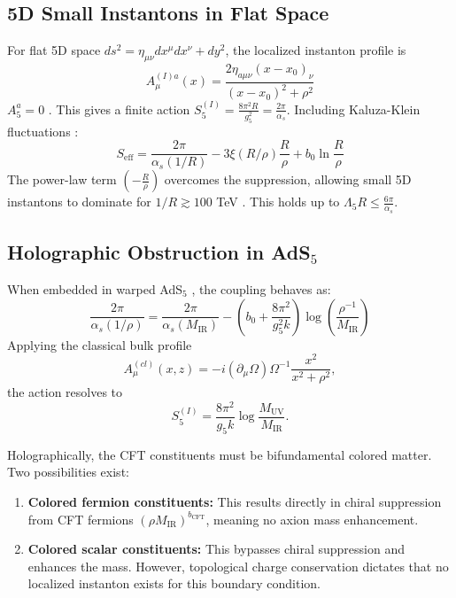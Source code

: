 \documentclass[11pt]{article}
\begin{document}
\subsection{5D Small Instantons in Flat Space}
For flat 5D space $ds^2 = \eta_{\mu\nu} dx^\mu dx^\nu + dy^2$, the localized instanton profile is
\begin{equation}
    A_\mu^{(I)a}(x) = \frac{2 \eta_{a\mu\nu} (x-x_0)_\nu}{(x-x_0)^2 + \rho^2}
\end{equation}
$A_5^a = 0$ \cite{poppitz2002}. This gives a finite action $S_5^{(I)} = \frac{8\pi^2 R}{g_5^2} = \frac{2\pi}{\alpha_s}$. Including Kaluza-Klein fluctuations \cite{dienes1998}:
\begin{equation}
    S_{\text{eff}} = \frac{2\pi}{\alpha_s(1/R)} - 3\xi(R/\rho) \frac{R}{\rho} + b_0 \ln \frac{R}{\rho}
\end{equation}
The power-law term $(- \frac{R}{\rho})$ overcomes the suppression, allowing small 5D instantons to dominate for $1/R \gtrsim 100$ TeV \cite{gherghetta2020}. This holds up to $\Lambda_5 R \le \frac{6\pi}{\alpha_s}$.

\subsection{Holographic Obstruction in AdS$_5$}
When embedded in warped AdS$_5$ \cite{gherghetta2021}, the coupling behaves as:
\begin{equation}
    \frac{2\pi}{\alpha_s(1/\rho)} = \frac{2\pi}{\alpha_s(M_{\text{IR}})} - \left(b_0 + \frac{8\pi^2}{g_5^2 k}\right) \log\left(\frac{\rho^{-1}}{M_{\text{IR}}}\right)
\end{equation}
Applying the classical bulk profile
\begin{equation}
    A_\mu^{(cl)}(x,z) = -i (\partial_\mu \Omega) \Omega^{-1} \frac{x^2}{x^2 + \rho^2},
\end{equation}
the action resolves to
\begin{equation}
    S_5^{(I)} = \frac{8\pi^2}{g_5 k} \log \frac{M_{\text{UV}}}{M_{\text{IR}}}.
\end{equation}

Holographically, the CFT constituents must be bifundamental colored matter. Two possibilities exist:
\begin{enumerate}
    \item \textbf{Colored fermion constituents:} This results directly in chiral suppression from CFT fermions $(\rho M_{\text{IR}})^{b_{\text{CFT}}}$, meaning no axion mass enhancement.
    \item \textbf{Colored scalar constituents:} This bypasses chiral suppression and enhances the mass. However, topological charge conservation dictates that no localized instanton exists for this boundary condition.
\end{enumerate}
\end{document}
